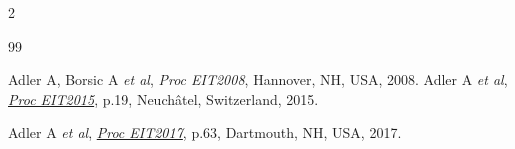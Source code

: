 \documentclass[10pt,letterpaper]{article}
\renewenvironment{thebibliography}[1]{%
    \begin{oldthebibliography}{#1}%
      \setlength{\parskip}{0ex}%
      \setlength{\itemsep}{0ex}%
  }%
  {%
    \end{oldthebibliography}%
  }
\begin{document}
\begin{multicols}{2}
\begin{thebibliography}{99}
Adler A, Borsic A {\em et al},
{\em Proc EIT2008}, Hannover, NH, USA, 2008.
Adler A {\em et al}, %
\href{https://zenodo.org/record/17752}{\em Proc EIT2015}, p.19, 
 Neuchâtel, Switzerland, 2015.

Adler A {\em et al}, %
\href{https://zenodo.org/record/557093}{\em Proc EIT2017}, p.63, 
Dartmouth, NH, USA,  2017.
\end{thebibliography}
\end{multicols}
\end{document}
